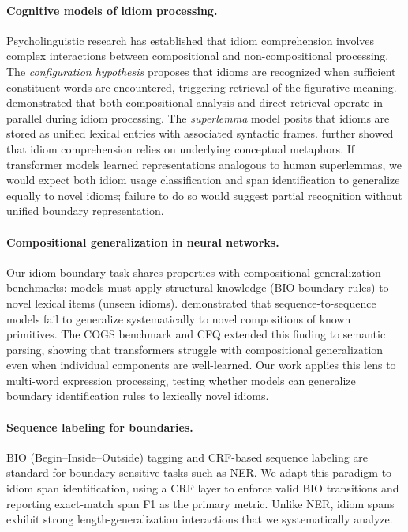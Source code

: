 \documentclass[11pt]{article}
\begin{document}
\paragraph{Cognitive models of idiom processing.}
Psycholinguistic research has established that idiom comprehension involves complex interactions between compositional and non-compositional processing. The \textit{configuration hypothesis} \citep{cacciari1988comprehension} proposes that idioms are recognized when sufficient constituent words are encountered, triggering retrieval of the figurative meaning. \citet{titone1999processing} demonstrated that both compositional analysis and direct retrieval operate in parallel during idiom processing. The \textit{superlemma} model \citep{sprenger2006lexical} posits that idioms are stored as unified lexical entries with associated syntactic frames. \citet{gibbs1990psycholinguistic} further showed that idiom comprehension relies on underlying conceptual metaphors. If transformer models learned representations analogous to human superlemmas, we would expect both idiom usage classification and span identification to generalize equally to novel idioms; failure to do so would suggest partial recognition without unified boundary representation.

\paragraph{Compositional generalization in neural networks.}
Our idiom boundary task shares properties with compositional generalization benchmarks: models must apply structural knowledge (BIO boundary rules) to novel lexical items (unseen idioms). \citet{lake2018generalization} demonstrated that sequence-to-sequence models fail to generalize systematically to novel compositions of known primitives. The COGS benchmark \citep{kim2020cogs} and CFQ \citep{keysers2020measuring} extended this finding to semantic parsing, showing that transformers struggle with compositional generalization even when individual components are well-learned. Our work applies this lens to multi-word expression processing, testing whether models can generalize boundary identification rules to lexically novel idioms.

\paragraph{Sequence labeling for boundaries.}
BIO (Begin--Inside--Outside) tagging \citep{ramshaw1995text} and CRF-based sequence labeling \citep{lample2016neural} are standard for boundary-sensitive tasks such as NER. We adapt this paradigm to idiom span identification, using a CRF layer to enforce valid BIO transitions and reporting exact-match span F1 as the primary metric. Unlike NER, idiom spans exhibit strong length-generalization interactions that we systematically analyze.
\end{document}
